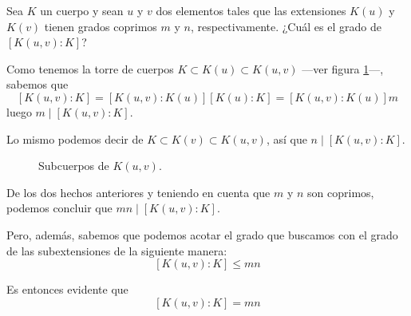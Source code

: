 \documentclass[a4paper, 11pt]{article}
\begin{document}
  \maketitle
  \begin{ejercicio}
      Sea \(K\) un cuerpo y sean \(u\) y \(v\) dos elementos tales que las extensiones \(K(u)\) y \(K(v)\) tienen grados coprimos \(m\) y \(n\), respectivamente. ¿Cuál es el grado de \([K(u,v):K]\)?
  \end{ejercicio}

  \begin{solucion}
      Como tenemos la torre de cuerpos \(K \subset K(u) \subset K(u,v)\) ---ver figura \ref{subcuerpos}---, sabemos que
      \[
      [K(u,v):K]=[K(u,v):K(u)][K(u):K]=[K(u,v):K(u)]m
      \]
      luego \(m\mid[K(u,v):K]\).

      Lo mismo podemos decir de \(K \subset K(v) \subset K(u,v)\), así que \(n\mid[K(u,v):K]\).

      \begin{figure}[ht]
          \centering
          \caption{Subcuerpos de $K(u,v)$.}
          \label{subcuerpos}
      \end{figure}

      De los dos hechos anteriores y teniendo en cuenta que $m$ y $n$ son coprimos, podemos concluir que \(mn\mid[K(u,v):K]\).

      Pero, además, sabemos que podemos acotar el grado que buscamos con el grado de las subextensiones de la siguiente manera:
      \[
      [K(u,v):K] \leq mn
      \]

      Es entonces evidente que
      \[
      [K(u,v):K]=mn
      \]
  \end{solucion}
\end{document}
